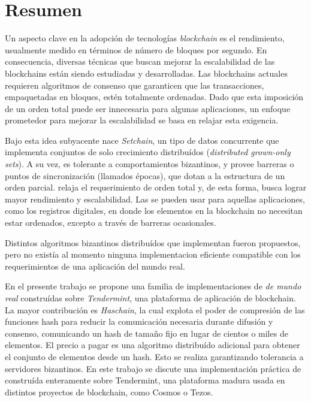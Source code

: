   \chapter*{Resumen}
  Un aspecto clave en la adopción de tecnologías \textit{blockchain} es el rendimiento,
  usualmente medido en términos de número de bloques por segundo.
  En consecuencia, diversas técnicas que buscan mejorar la escalabilidad de las blockchains
  están siendo estudiadas y desarrolladas.
  Las blockchains actuales requieren algoritmos de consenso que garanticen que las
  transacciones, empaquetadas en bloques, estén totalmente ordenadas.
  Dado que esta imposición de un orden total puede ser innecesaria para algunas aplicaciones,
  un enfoque prometedor para mejorar la escalabilidad se basa en relajar esta exigencia.

  Bajo esta idea subyacente nace \textit{Setchain}, un tipo de
  datos concurrente que implementa conjuntos de solo crecimiento distribuídos 
  (\textit{distributed grown-only sets}). A su vez,
  es tolerante a comportamientos bizantinos, y provee barreras o puntos de sincronización
  (llamados épocas), que dotan a la estructura de un orden parcial.
  \setchain relaja el requerimiento de orden total y, de esta forma, busca lograr mayor
  rendimiento y escalabilidad.
  Las \setchains se pueden usar para aquellas aplicaciones, como los registros digitales,
  en donde los elementos en la blockchain no necesitan estar ordenados, excepto a través
  de barreras ocasionales.
  
  
  Distintos algoritmos bizantinos distribuídos que implementan \setchain fueron
  propuestos, pero no existía al momento ninguna implementacion eficiente compatible con
  los requerimientos de una aplicación del mundo real.
  
  En el presente trabajo se propone una familia de implementaciones de \setchain 
  \textit{de mundo real} construídas sobre \textit{Tendermint}, una plataforma de
  aplicación de blockchain.  
  La mayor contribución es \textit{Haschain}, la cual explota el poder de compresión de las
  funciones hash para reducir la comunicación necesaria durante difusión y consenso,
  comunicando un hash de tamaño fijo en lugar de cientos o miles de elementos.
  El precio a pagar es una algoritmo distribuído adicional para obtener el conjunto de
  elementos desde un hash. Esto se realiza garantizando tolerancia a servidores bizantinos.
  En este trabajo se discute una implementación práctica de \hashchain construída enteramente
  sobre Tendermint, una plataforma madura usada en distintos proyectos de blockchain, como
  Cosmos o Tezos.


